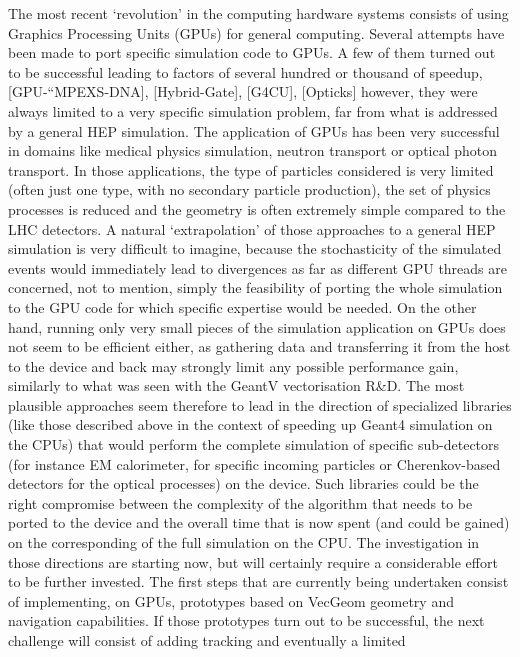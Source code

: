 \documentclass[11pt,a4paper]{article}
\begin{document}
The most recent `revolution' in the computing hardware systems consists
of using Graphics Processing Units (GPUs) for general computing. Several
attempts have been made to port specific simulation code to GPUs. A few
of them turned out to be successful leading to factors of several
hundred or thousand of speedup, {[}GPU-``MPEXS-DNA{]},
{[}Hybrid-Gate{]}, {[}G4CU{]}, {[}Opticks{]} however, they were always
limited to a very specific simulation problem, far from what is
addressed by a general HEP simulation. The application of GPUs has been
very successful in domains like medical physics simulation, neutron
transport or optical photon transport. In those applications, the type
of particles considered is very limited (often just one type, with no
secondary particle production), the set of physics processes is reduced
and the geometry is often extremely simple compared to the LHC
detectors. A natural `extrapolation' of those approaches to a general
HEP simulation is very difficult to imagine, because the stochasticity
of the simulated events would immediately lead to divergences as far as
different GPU threads are concerned, not to mention, simply the
feasibility of porting the whole simulation to the GPU code for which
specific expertise would be needed. On the other hand, running only very
small pieces of the simulation application on GPUs does not seem to be
efficient either, as gathering data and transferring it from the host to
the device and back may strongly limit any possible performance gain,
similarly to what was seen with the GeantV vectorisation R\&D. The most
plausible approaches seem therefore to lead in the direction of
specialized libraries (like those described above in the context of
speeding up Geant4 simulation on the CPUs) that would perform the
complete simulation of specific sub-detectors (for instance EM
calorimeter, for specific incoming particles or Cherenkov-based
detectors for the optical processes) on the device. Such libraries could
be the right compromise between the complexity of the algorithm that
needs to be ported to the device and the overall time that is now spent
(and could be gained) on the corresponding of the full simulation on the
CPU. The investigation in those directions are starting now, but will
certainly require a considerable effort to be further invested. The
first steps that are currently being undertaken consist of implementing,
on GPUs, prototypes based on VecGeom geometry and navigation
capabilities. If those prototypes turn out to be successful, the next
challenge will consist of adding tracking and eventually a limited
\end{document}
